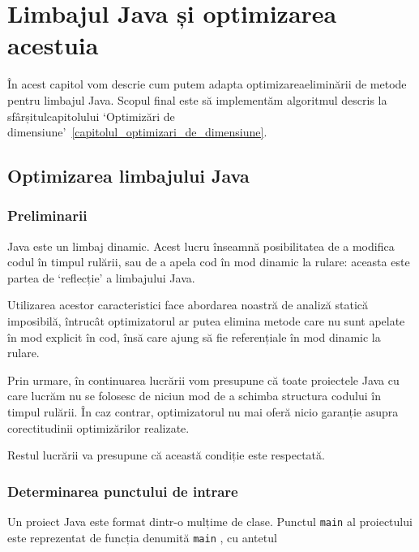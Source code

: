 \chapter{Limbajul Java și optimizarea acestuia}

În acest capitol vom descrie cum putem adapta optimizareaeliminării de metode pentru limbajul Java.
Scopul final este să implementăm algoritmul descris la sfârșitulcapitolului `Optimizări de dimensiune'~\ref{capitolul_optimizari_de_dimensiune}.

\section{Optimizarea limbajului Java}


\subsection{Preliminarii}

Java este un limbaj dinamic. Acest lucru înseamnă posibilitatea de a modifica
codul în timpul rulării, sau de a apela cod în mod dinamic la rulare: aceasta
este partea de `reflecție' a limbajului Java.

Utilizarea acestor caracteristici face abordarea noastră de analiză
statică imposibilă, întrucât optimizatorul ar putea elimina metode care nu sunt
apelate în mod explicit în cod, însă care ajung să fie referențiale în mod
dinamic la rulare.

Prin urmare, în continuarea lucrării vom presupune că toate proiectele Java cu
care lucrăm nu se folosesc de niciun mod de a schimba structura codului în
timpul rulării. În caz contrar, optimizatorul nu mai oferă nicio garanție asupra
corectitudinii optimizărilor realizate.

Restul lucrării va presupune că această condiție este respectată.

\subsection{Determinarea punctului de intrare}

Un proiect Java este format dintr-o mulțime de clase.
Punctul \texttt{main} al proiectului este reprezentat de funcția
denumită \texttt{main} \cite{java_main}, cu antetul

